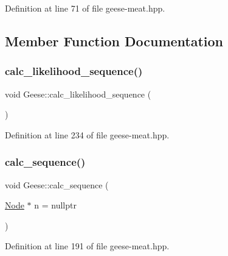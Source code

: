 Definition at line 71 of file geese-\/meat.\+hpp.



\subsection{Member Function Documentation}
\mbox{\label{class_geese_a1abfd10b18e87a638ef386c919417500}} 
\subsubsection{\texorpdfstring{calc\+\_\+likelihood\+\_\+sequence()}{calc\_likelihood\_sequence()}}
{\footnotesize\ttfamily void Geese\+::calc\+\_\+likelihood\+\_\+sequence (\begin{DoxyParamCaption}{ }\end{DoxyParamCaption})\hspace{0.3cm}{\ttfamily [inline]}}



Definition at line 234 of file geese-\/meat.\+hpp.

\mbox{\label{class_geese_aa71af5fe38d785cc184c904fc9308dc1}} 
\subsubsection{\texorpdfstring{calc\+\_\+sequence()}{calc\_sequence()}}
{\footnotesize\ttfamily void Geese\+::calc\+\_\+sequence (\begin{DoxyParamCaption}\item[{\hyperlink{class_node}{Node} $\ast$}]{n = {\ttfamily nullptr} }\end{DoxyParamCaption})\hspace{0.3cm}{\ttfamily [inline]}}



Definition at line 191 of file geese-\/meat.\+hpp.

\mbox{\label{class_geese_a5c9cf28a69270fe4d3f48984fe2c5723}} 
